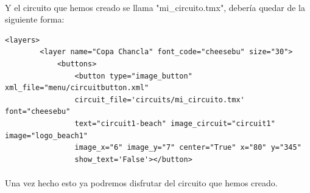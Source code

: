 \paragraph{}
Y el circuito que hemos creado se llama "mi\_circuito.tmx", debería quedar de la siguiente forma:

\begin{lstlisting}[style=XML]
    <layers>
        <layer name="Copa Chancla" font_code="cheesebu" size="30">
            <buttons>
                <button type="image_button" xml_file="menu/circuitbutton.xml" 
                circuit_file='circuits/mi_circuito.tmx' font="cheesebu" 
                text="circuit1-beach" image_circuit="circuit1" image="logo_beach1" 
                image_x="6" image_y="7" center="True" x="80" y="345" 
                show_text='False'></button>
\end{lstlisting}

\paragraph{}
Una vez hecho esto ya podremos disfrutar del circuito que hemos creado.
